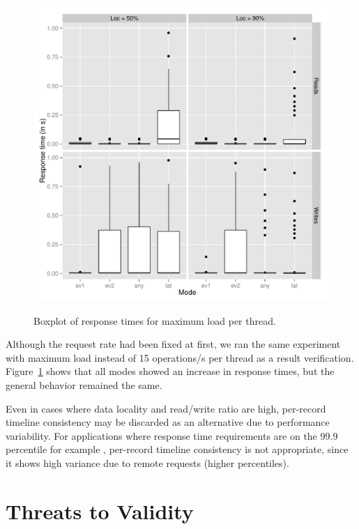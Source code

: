 \documentclass[man,floatsintext,12pt]{apa6}
\begin{document}
\begin{figure}[h!]
\caption{Boxplot of response times for maximum load per thread.}
\includegraphics[width=1.0\textwidth]{boxplot200_max.png}
\label{fig:boxplot_dos_tempos_de_resposta_para_carga_maxima}
\end{figure}

Although the request rate had been fixed at first, we ran the same experiment
with maximum load instead of 15 operations/s per thread as a result
verification. Figure~\ref{fig:boxplot_dos_tempos_de_resposta_para_carga_maxima}
shows that all modes showed an increase in response times, but the general
behavior remained the same.

Even in cases where data locality and read/write ratio are high, per-record
timeline consistency may be discarded as an alternative due to performance
variability. For applications where response time requirements are on the 99.9
percentile for example \parencite{DeCandia2007}, per-record timeline
consistency is not appropriate, since it shows high variance due to remote
requests (higher percentiles).

\label{threats_to_validity}
\section{Threats to Validity}
\end{document}
